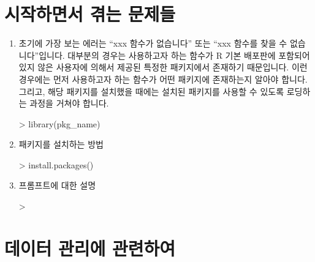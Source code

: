 \section{시작하면서 겪는 문제들}
\begin{enumerate}
	\item 초기에 가장 보는 에러는 ``xxx 함수가 없습니다'' 또는 ``xxx 함수를 찾을 수 없습니다''입니다.
	대부분의 경우는 사용하고자 하는 함수가 R 기본 배포판에 포함되어 있지 않은 사용자에 의해서 제공된 특정한 패키지에서 존재하기 때문입니다.
	이런 경우에는 먼저 사용하고자 하는 함수가 어떤 패키지에 존재하는지 알아야 합니다.
	그리고, 해당 패키지를 설치했을 때에는 설치된 패키지를 사용할 수 있도록 로딩하는 과정을 거쳐야 합니다.

\begin{Schunk}
\begin{Soutput}
> library(pkg_name)	
\end{Soutput}
\end{Schunk}

\item 패키지를 설치하는 방법
\begin{Schunk}
\begin{Soutput}
> install.packages()
\end{Soutput}
\end{Schunk}


\item 프롬프트에 대한 설명
\begin{Schunk}
\begin{Soutput}
>
\end{Soutput}
\end{Schunk}

\end{enumerate}




\section{데이터 관리에 관련하여}


